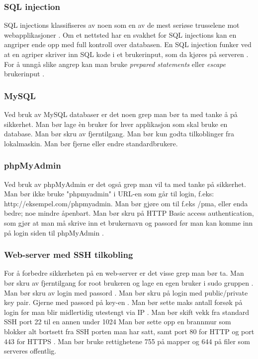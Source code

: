 \subsubsection{SQL injection}
\label{sec:analysis-security-sql-injection}
SQL injections klassifiseres av noen som en av de mest seriøse trusselene mot webapplikasjoner \cite[s.~1]{halfond2006classification}. Om et nettsted har en svakhet for SQL injections kan en angriper ende opp med full kontroll over databasen.
En SQL injection funker ved at en agriper skriver inn SQL kode i et brukerinput, som da kjøres på serveren \cite[s.~2]{halfond2006classification}.
For å unngå slike angrep kan man bruke \textit{prepared statements} eller \textit{escape} brukerinput \cite[s.~6]{halfond2006classification}.

\subsubsection{MySQL}
\label{sec:analysis-security-mysql}
Ved bruk av MySQL databaser er det noen grep man bør ta med tanke 
å på sikkerhet.
Man bør lage èn bruker for hver applikasjon som skal bruke en database. \cite{ellingwood_2013}
Man bør skru av fjerntilgang.
Man bør kun godta tilkoblinger fra lokalmaskin.
Man bør fjerne eller endre standardbrukere.

\subsubsection{phpMyAdmin}
\label{sec:analysis-security-phpmyadmin}
Ved bruk av phpMyAdmin er det også grep man vil ta med tanke på sikkerhet. Man bør ikke bruke "phpmyadmin" i URL-en som går til login, f.eks: http://eksempel.com/phpmyadmin. Man bør gjøre om til f.eks /pma, eller enda bedre; noe mindre åpenbart.\cite{canepa2016}
Man bør skru på HTTP Basic access authentication, som gjør at man må skrive inn et brukernavn og passord før man kan komme inn på login siden til phpMyAdmin \cite{drake_2018}.

\subsubsection{Web-server med SSH tilkobling}
\label{sec:analysis-security-web-server-ssh}
For å forbedre sikkerheten på en web-server er det visse grep man bør ta.
Man bør skru av fjerntilgang for root brukeren og lage en egen bruker i sudo gruppen \cite{ellingwood_2014}.
Man bør skru av login med passord \cite{jetha2018}.
Man bør skru på login med public/private key pair. Gjerne med passord på key-en \cite{jetha2018}.
Man bør sette maks antall forsøk på login før man blir midlertidig utestengt via IP \cite{ellingwood_2014_2}.
Man bør skift vekk fra standard SSH port 22 til en annen under 1024 \cite{w3cports1995}
Man bør sette opp en brannmur som blokker alt bortsett fra SSH porten man har satt, samt port 80 for HTTP og port 443 for HTTPS \cite{virdo2016}.
Man bør bruke rettighetene 755 på mapper og 644 på filer som serveres offentlig. \cite[s.~34]{barnettapache}

